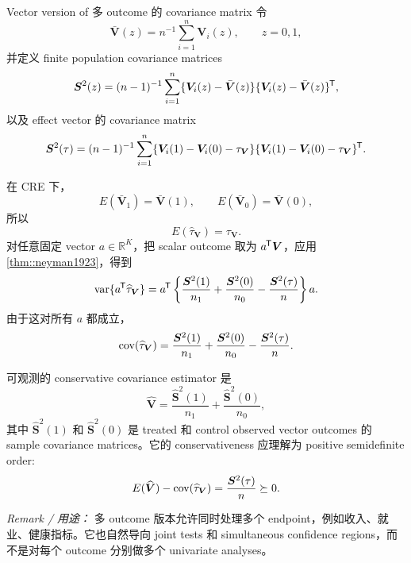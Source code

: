 \begin{exercisesolution}{Vector version of \citet{Neyman:1923}}{多 outcome 的 covariance matrix}
令
\[
\bar{\boldsymbol V}(z)=n^{-1}\sum_{i=1}^n\boldsymbol V_i(z),\qquad z=0,1,
\]
并定义 finite population covariance matrices
\[
\boldsymbol S^2(z)
=(n-1)^{-1}\sum_{i=1}^n
\{\boldsymbol V_i(z)-\bar{\boldsymbol V}(z)\}
\{\boldsymbol V_i(z)-\bar{\boldsymbol V}(z)\}^{\mkern-1.5mu\mathsf{T}},
\]
以及 effect vector 的 covariance matrix
\[
\boldsymbol S^2(\tau)
=(n-1)^{-1}\sum_{i=1}^n
\{\boldsymbol V_i(1)-\boldsymbol V_i(0)-\tau_{\boldsymbol V}\}
\{\boldsymbol V_i(1)-\boldsymbol V_i(0)-\tau_{\boldsymbol V}\}^{\mkern-1.5mu\mathsf{T}}.
\]

在 CRE 下，
\[
E(\bar{\boldsymbol V}_1)=\bar{\boldsymbol V}(1),\qquad
E(\bar{\boldsymbol V}_0)=\bar{\boldsymbol V}(0),
\]
所以
\[
E(\widehat\tau_{\boldsymbol V})=\tau_{\boldsymbol V}.
\]
对任意固定 vector $a\in\mathbb R^K$，把 scalar outcome 取为 $a^{\mkern-1.5mu\mathsf{T}} \boldsymbol V$，应用 \cref{thm::neyman1923}，得到
\[
\textup{var}\{a^{\mkern-1.5mu\mathsf{T}} \widehat\tau_{\boldsymbol V}\}
=
a^{\mkern-1.5mu\mathsf{T}}\left\{
\frac{\boldsymbol S^2(1)}{n_1}
+\frac{\boldsymbol S^2(0)}{n_0}
-\frac{\boldsymbol S^2(\tau)}{n}
\right\}a.
\]
由于这对所有 $a$ 都成立，
\[
\textup{cov}(\widehat\tau_{\boldsymbol V})
=
\frac{\boldsymbol S^2(1)}{n_1}
+\frac{\boldsymbol S^2(0)}{n_0}
-\frac{\boldsymbol S^2(\tau)}{n}.
\]

可观测的 conservative covariance estimator 是
\[
\widehat{\boldsymbol V}
=
\frac{\widehat{\boldsymbol S}^2(1)}{n_1}
+\frac{\widehat{\boldsymbol S}^2(0)}{n_0},
\]
其中 $\widehat{\boldsymbol S}^2(1)$ 和 $\widehat{\boldsymbol S}^2(0)$ 是 treated 和 control observed vector outcomes 的 sample covariance matrices。它的 conservativeness 应理解为 positive semidefinite order:
\[
E(\widehat{\boldsymbol V})-\textup{cov}(\widehat\tau_{\boldsymbol V})
=\frac{\boldsymbol S^2(\tau)}{n}\succeq 0.
\]

\emph{Remark / 用途：} 多 outcome 版本允许同时处理多个 endpoint，例如收入、就业、健康指标。它也自然导向 joint tests 和 simultaneous confidence regions，而不是对每个 outcome 分别做多个 univariate analyses。
\end{exercisesolution}

